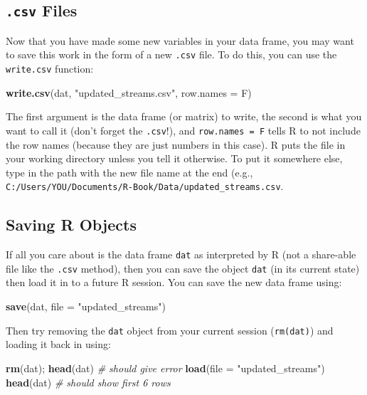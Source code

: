\documentclass[]{book}
\newenvironment{Shaded}{\begin{snugshade}}{\end{snugshade}}
\newcommand{\KeywordTok}[1]{\textcolor[rgb]{0.13,0.29,0.53}{\textbf{#1}}}
\newcommand{\DataTypeTok}[1]{\textcolor[rgb]{0.13,0.29,0.53}{#1}}
\newcommand{\StringTok}[1]{\textcolor[rgb]{0.31,0.60,0.02}{#1}}
\newcommand{\CommentTok}[1]{\textcolor[rgb]{0.56,0.35,0.01}{\textit{#1}}}
\newcommand{\NormalTok}[1]{#1}
\theoremstyle{definition}
\theoremstyle{definition}
\theoremstyle{definition}
\theoremstyle{remark}
\begin{document}
\subsection{\texorpdfstring{\texttt{.csv}
Files}{.csv Files}}\label{csv-files}

Now that you have made some new variables in your data frame, you may
want to save this work in the form of a new \texttt{.csv} file. To do
this, you can use the \texttt{write.csv} function:

\begin{Shaded}
\begin{Highlighting}[]
\KeywordTok{write.csv}\NormalTok{(dat, }\StringTok{"updated_streams.csv"}\NormalTok{, }\DataTypeTok{row.names =}\NormalTok{ F)}
\end{Highlighting}
\end{Shaded}

The first argument is the data frame (or matrix) to write, the second is
what you want to call it (don't forget the \texttt{.csv}!), and
\texttt{row.names\ =\ F} tells R to not include the row names (because
they are just numbers in this case). R puts the file in your working
directory unless you tell it otherwise. To put it somewhere else, type
in the path with the new file name at the end (e.g.,
\texttt{C:/Users/YOU/Documents/R-Book/Data/updated\_streams.csv}.

\subsection{Saving R Objects}\label{saving-r-objects}

If all you care about is the data frame \texttt{dat} as interpreted by R
(not a share-able file like the \texttt{.csv} method), then you can save
the object \texttt{dat} (in its current state) then load it in to a
future R session. You can save the new data frame using:

\begin{Shaded}
\begin{Highlighting}[]
\KeywordTok{save}\NormalTok{(dat, }\DataTypeTok{file =} \StringTok{"updated_streams"}\NormalTok{)}
\end{Highlighting}
\end{Shaded}

Then try removing the \texttt{dat} object from your current session
(\texttt{rm(dat)}) and loading it back in using:

\begin{Shaded}
\begin{Highlighting}[]
\KeywordTok{rm}\NormalTok{(dat); }\KeywordTok{head}\NormalTok{(dat)  }\CommentTok{# should give error}
\KeywordTok{load}\NormalTok{(}\DataTypeTok{file =} \StringTok{"updated_streams"}\NormalTok{)}
\KeywordTok{head}\NormalTok{(dat) }\CommentTok{# should show first 6 rows}
\end{Highlighting}
\end{Shaded}
\end{document}
